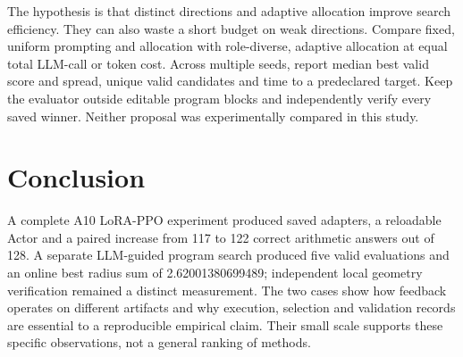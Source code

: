 The hypothesis is that distinct directions and adaptive allocation improve search efficiency. They can also waste a short budget on weak directions. Compare fixed, uniform prompting and allocation with role-diverse, adaptive allocation at equal total LLM-call or token cost. Across multiple seeds, report median best valid score and spread, unique valid candidates and time to a predeclared target. Keep the evaluator outside editable program blocks and independently verify every saved winner. Neither proposal was experimentally compared in this study.

\section{Conclusion}
A complete A10 LoRA-PPO experiment produced saved adapters, a reloadable Actor and a paired increase from 117 to 122 correct arithmetic answers out of 128. A separate LLM-guided program search produced five valid evaluations and an online best radius sum of 2.62001380699489; independent local geometry verification remained a distinct measurement. The two cases show how feedback operates on different artifacts and why execution, selection and validation records are essential to a reproducible empirical claim. Their small scale supports these specific observations, not a general ranking of methods.
